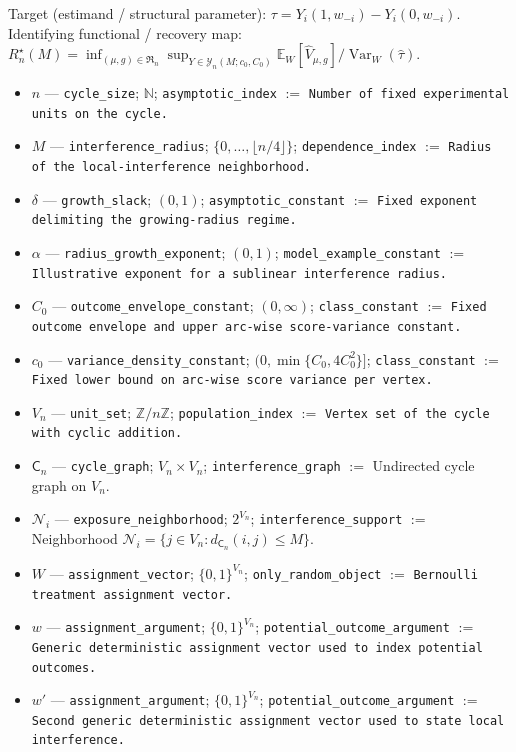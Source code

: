 \documentclass{article}
\begin{document}
Target (estimand / structural parameter): \(\tau=Y_i(1,w_{-i})-Y_i(0,w_{-i})\).
Identifying functional / recovery map: \(R_n^\star(M)=\inf_{(\mu,g)\in\mathfrak R_n}\sup_{Y\in\mathcal Y_n(M;c_0,C_0)}\mathbb E_W[\widehat V_{\mu,g}]/\operatorname{Var}_W(\widehat\tau)\).
\begin{itemize}
  \item \(n\) --- \texttt{cycle\_size}; \(\mathbb N\); \texttt{asymptotic\_index} $:=$ \texttt{Number of fixed experimental units on the cycle.}
  \item \(M\) --- \texttt{interference\_radius}; \(\{0,\ldots,\lfloor n/4\rfloor\}\); \texttt{dependence\_index} $:=$ \texttt{Radius of the local-interference neighborhood.}
  \item \(\delta\) --- \texttt{growth\_slack}; \((0,1)\); \texttt{asymptotic\_constant} $:=$ \texttt{Fixed exponent delimiting the growing-radius regime.}
  \item \(\alpha\) --- \texttt{radius\_growth\_exponent}; \((0,1)\); \texttt{model\_example\_constant} $:=$ \texttt{Illustrative exponent for a sublinear interference radius.}
  \item \(C_0\) --- \texttt{outcome\_envelope\_constant}; \((0,\infty)\); \texttt{class\_constant} $:=$ \texttt{Fixed outcome envelope and upper arc-wise score-variance constant.}
  \item \(c_0\) --- \texttt{variance\_density\_constant}; \((0,\min\{C_0,4C_0^2\}]\); \texttt{class\_constant} $:=$ \texttt{Fixed lower bound on arc-wise score variance per vertex.}
  \item \(V_n\) --- \texttt{unit\_set}; \(\mathbb Z/n\mathbb Z\); \texttt{population\_index} $:=$ \texttt{Vertex set of the cycle with cyclic addition.}
  \item \(\mathsf C_n\) --- \texttt{cycle\_graph}; \(V_n\times V_n\); \texttt{interference\_graph} $:=$ Undirected cycle graph on \(V_n\).
  \item \(\mathcal N_i\) --- \texttt{exposure\_neighborhood}; \(2^{V_n}\); \texttt{interference\_support} $:=$ Neighborhood \(\mathcal N_i=\{j\in V_n:d_{\mathsf C_n}(i,j)\le M\}\).
  \item \(W\) --- \texttt{assignment\_vector}; \(\{0,1\}^{V_n}\); \texttt{only\_random\_object} $:=$ \texttt{Bernoulli treatment assignment vector.}
  \item \(w\) --- \texttt{assignment\_argument}; \(\{0,1\}^{V_n}\); \texttt{potential\_outcome\_argument} $:=$ \texttt{Generic deterministic assignment vector used to index potential outcomes.}
  \item \(w'\) --- \texttt{assignment\_argument}; \(\{0,1\}^{V_n}\); \texttt{potential\_outcome\_argument} $:=$ \texttt{Second generic deterministic assignment vector used to state local interference.}

\end{itemize}
\end{document}
